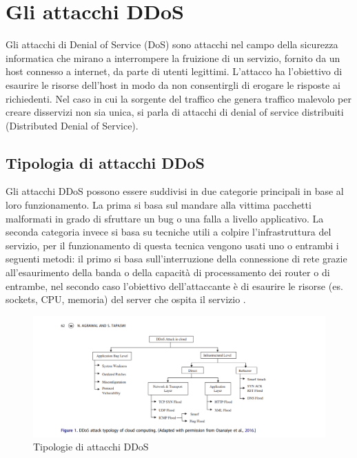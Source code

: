 \section{Gli attacchi DDoS}

Gli attacchi di Denial of Service (DoS) sono attacchi nel campo della sicurezza informatica che mirano a interrompere la fruizione di un servizio, fornito da un host connesso a internet, da parte di utenti legittimi. L'attacco ha l'obiettivo di esaurire le risorse dell'host in modo da non consentirgli di erogare le risposte ai richiedenti.
Nel caso in cui la sorgente del traffico che genera traffico malevolo per creare disservizi non sia unica, si parla di attacchi di denial of service distribuiti (Distributed Denial of Service).

\subsection{Tipologia di attacchi DDoS}
    
Gli attacchi DDoS possono essere suddivisi in due categorie principali in base al loro funzionamento. La prima si basa sul mandare alla vittima pacchetti malformati in grado di sfruttare un bug o una falla a livello applicativo. La seconda categoria invece si basa su tecniche utili a colpire l'infrastruttura del servizio, per il funzionamento di questa tecnica vengono usati uno o entrambi i seguenti metodi: il primo si basa sull'interruzione della connessione di rete grazie all'esaurimento della banda o della capacità di processamento dei router o di entrambe, nel secondo caso l'obiettivo dell'attaccante è di esaurire le risorse (es. sockets, CPU, memoria) del server che ospita il servizio \cite{ddos_survey_1}.

\begin{figure}[h]

    \includegraphics[width=\hsize]{images/introduzione/tipologie_ddos.png}
    \caption{Tipologie di attacchi DDoS \cite{ddos_survey_3}}
    \centering
\end{figure}

